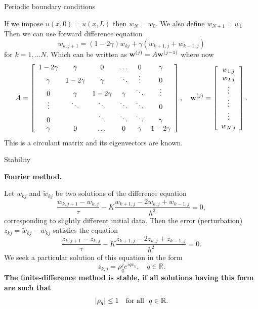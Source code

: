 \documentclass{beamer}
\begin{document}
\begin{frame}{\small Periodic boundary conditions}

{\small
If we impose $u(x,0)=u(x,L)$ then $w_N = w_0$. We also define
$w_{N+1}=w_{1}$ Then we can use forward difference
equation
\[
w_{k,j+1}=\left(1-2\gamma\right)w_{kj}+
\gamma\left(
w_{k+1, j}+w_{k-1,j}\right)
\]
for $k=1,\dots N$. Which can be written as
${\bf w}^{(j)}=A{\bf w}^{(j-1)} $
where now
\[
A=\left[
\begin{array}{cccccc}
1-2\gamma &\gamma &0      &\dots  &0 &\gamma \\
\gamma &1-2\gamma &\gamma &\ddots  &\vdots &0\\
0      &\gamma &1-2\gamma &\gamma &\ddots &\vdots \\
\vdots &\ddots &\ddots &\ddots &\ddots &0 \\
0 &       &\ddots &\ddots &\ddots &\gamma \\
\gamma      &0  &\dots  &0      &\gamma &1-2\gamma
\end{array}\right], \quad
{\bf w}^{(j)}=\left[
\begin{array}{c}
w_{1,j} \\
w_{2,j} \\
\vdots \\
\vdots \\
\vdots \\
w_{N,j}
\end{array}\right].
\label{bp7}
\]
}
This is a circulant matrix and its eigenvectors are known.
\end{frame}



\begin{frame}{Stability}

{\small

\textbf{Fourier method.}


Let $w_{kj}$  and $\tilde{w}_{kj}$ be two solutions of the difference equation
\[
\frac{w_{k,j+1}-w_{k,j}}{\tau}-K\frac{w_{k+1,j}-2w_{k,j}+w_{k-1,j}}{h^2}=0,
\]
corresponding to slightly different initial data.
Then the error (perturbation) $z_{kj}=\tilde{w}_{kj}-w_{kj}$ satisfies the equation
\[
\frac{z_{k,j+1}-z_{k,j}}{\tau}-K\frac{z_{k+1,j}-2z_{k,j}+z_{k-1,j}}{h^2}=0.
\]
We seek a particular solution of this equation in the form
\[
z_{k,j}=\rho_{q}^{j}e^{iqx_{k}}, \quad q\in{\mathbb R}.
\]
\textbf{The finite-difference method
is stable, if all solutions having this form are such that}
\[
\vert\rho_{q}\vert\leq 1 \quad {\rm for \ all} \ \ q\in{\mathbb R}.
\]
}

\end{frame}
\end{document}
